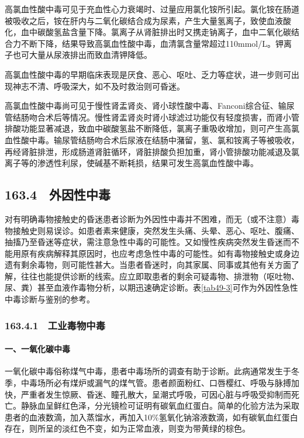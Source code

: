 高氯血性酸中毒可见于充血性心力衰竭时、过量应用氯化铵所引起。氯化铵在肠道被吸收之后，铵在肝内与二氧化碳结合成为尿素，产生大量氢离子，致使血液酸化，血中碳酸氢盐含量下降。氯离子从肾脏排出时又携走钠离子，血中二氧化碳结合力不断下降，结果导致高氯血性酸中毒，血清氯含量常超过110mmol/L。钾离子也可大量从尿液排出而致血清钾降低。

高氯血性酸中毒的早期临床表现是厌食、恶心、呕吐、乏力等症状，进一步则可出现神志不清、呼吸深大，如不及时救治则可昏迷。

高氯血性酸中毒尚可见于慢性肾盂肾炎、肾小球性酸中毒、Fanconi综合征、输尿管结肠吻合术后等情况。慢性肾盂肾炎时肾小球滤过功能仅有轻度损害，而肾小管排酸功能显著减退，致血中碳酸氢盐不断降低，氯离子重吸收增加，则可产生高氯血性酸中毒。输尿管结肠吻合术后尿液在结肠中潴留，氢、氯和铵离子等被吸收，再经肾脏排泄，形成肠道肾脏循环，肾脏排酸负担加重，肾小管排酸功能减退及氯离子等的渗透性利尿，使碱基不断耗损，结果可发生高氯血性酸中毒。

\protect\hypertarget{text00373.html}{}{}

\subsection{163.4　外因性中毒}

对有明确毒物接触史的昏迷患者诊断为外因性中毒并不困难，而无（或不注意）毒物接触史则易误诊。如患者素来健康，突然发生头痛、头晕、恶心、呕吐、腹痛、抽搐乃至昏迷等症状，需注意急性中毒的可能性。又如慢性疾病突然发生昏迷而不能用原有疾病解释其原因时，也应考虑急性中毒的可能性。如有毒物接触史或身边遗有剩余毒物，则可能性甚大。当患者昏迷时，向其家属、同事或其他有关方面了解，往往也能提供诊断的线索。应立即取患者的剩余可疑毒物、排泄物（呕吐物、尿、粪）甚至血液作毒物分析，以期迅速确定诊断。表\ref{tab49-3}可作为外因性急性中毒诊断与鉴别的参考。

\subsubsection{163.4.1　工业毒物中毒}

\paragraph{一、一氧化碳中毒}

一氧化碳中毒俗称煤气中毒，患者中毒场所的调查有助于诊断。此病通常发生于冬季，中毒场所必有煤炉或漏气的煤气管。患者颜面粉红、口唇樱红、呼吸与脉搏加快，严重者发生惊厥、昏迷、瞳孔散大，呈潮式呼吸，可因心脏与呼吸受抑制而死亡。静脉血呈鲜红色泽，分光镜检可证明有碳氧血红蛋白。简单的化验方法为采取患者的血液数滴，加入蒸馏水，再加入10\%氢氧化钠溶液数滴，如有碳氧血红蛋白存在，则所呈的淡红色不变，如为正常血液，则变为带黄绿的棕色。

